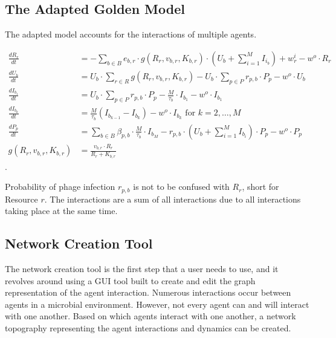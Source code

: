 \subsection{The Adapted Golden Model}
\label{sec:adapted_golden_model}
The adapted model accounts for the interactions of multiple agents. 
\begin{eqfloat}
    \begin{align}
        \frac{dR_r}{dt} &= -\sum_{b \in B} e_{b, r} \cdot g(R_r, v_{b, r}, K_{b, r})\cdot (U_b + \sum_{i=1}^{M} I_{i_b}) + w^i_r - w^o \cdot R_r\\
        \frac{dU_b}{dt} &= U_b \cdot \sum_{r \in R} g(R_r, v_{b, r}, K_{b, r}) - U_b \cdot \sum_{p \in P} r_{p, b} \cdot P_p - w^o \cdot U_b\\
        \frac{dI_{b_1}}{dt} &= U_b \cdot \sum_{p \in P}r_{p, b} \cdot P_p - \frac{M}{\tau_b}\cdot I_{b_1} - w^o \cdot I_{b_1}\\
        \frac{dI_{b_k}}{dt} &= \frac{M}{\tau_b}(I_{b_{k-1}}-I_{b_k}) - w^o \cdot I_{b_k}\text{ for } k=2, \dots, M \\
        \frac{dP_p}{dt} &= \sum_{b\in B}\beta_{p, b}\cdot\frac{M}{\tau_b} \cdot I_{b_M} - r_{p, b}\cdot(U_b + \sum_{i=1}^{M} I_{b_i})\cdot P_p - w^o \cdot P_p\\
        g(R_r, v_{b, r}, K_{b, r}) &= \frac{v_{b, r} \cdot R_r}{R_r + K_{b, r}}
        \label{eq:adapted_golden_model}
    \end{align}. 
    \caption{
        Probability of phage infection $r_{p, b}$ is not to be confused with $R_r$, short for Resource $r$. 
        The interactions are a sum of all interactions due to all interactions taking place at the same time. 
    }
\end{eqfloat}

\subsection{Network Creation Tool}
\label{sec:network_creation_tool}
The network creation tool is the first step that a user needs to use, and it revolves around using a GUI tool built to create and edit the graph representation of the agent interaction.
Numerous interactions occur between agents in a microbial environment.
However, not every agent can and will interact with one another.
Based on which agents interact with one another, a network topography representing the agent interactions and dynamics can be created. 

